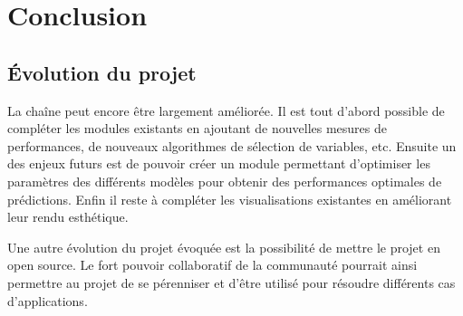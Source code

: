\chapter{Conclusion}

\section{Évolution du projet}

La chaîne peut encore être largement améliorée. Il est tout d’abord possible de compléter les
modules existants en ajoutant de nouvelles mesures de performances, de nouveaux algorithmes de
sélection de variables, etc. Ensuite un des enjeux futurs est de pouvoir créer un module permettant
d’optimiser les paramètres des différents modèles pour obtenir des performances optimales de
prédictions. Enfin il reste à compléter les visualisations existantes en améliorant leur rendu
esthétique.

Une autre évolution du projet évoquée est la possibilité de mettre le projet en open source. Le fort
pouvoir collaboratif de la communauté pourrait ainsi permettre au projet de se pérenniser et d’être
utilisé pour résoudre différents cas d'applications.
